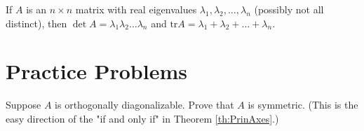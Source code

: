 \documentclass{ximera}
\begin{document}
\begin{corollary}\label{cor:det_and_tr}
If $A$ is an $n \times n$ matrix with real eigenvalues $\lambda_{1}, \lambda_{2}, \dots, \lambda_{n}$ (possibly not all distinct), then $\det A = \lambda_{1}\lambda_{2} \dots \lambda_{n}$ and $\mbox{tr} A = \lambda_{1} + \lambda_{2} + \dots  + \lambda_{n}$.
\end{corollary}

\section*{Practice Problems}

\begin{problem}\label{prob:ortho_diag_implies_symmetric}
Suppose $A$ is orthogonally diagonalizable.  Prove that $A$ is symmetric.  (This is the easy direction of the "if and only if" in Theorem \ref{th:PrinAxes}.)
\end{problem}
\end{document}
